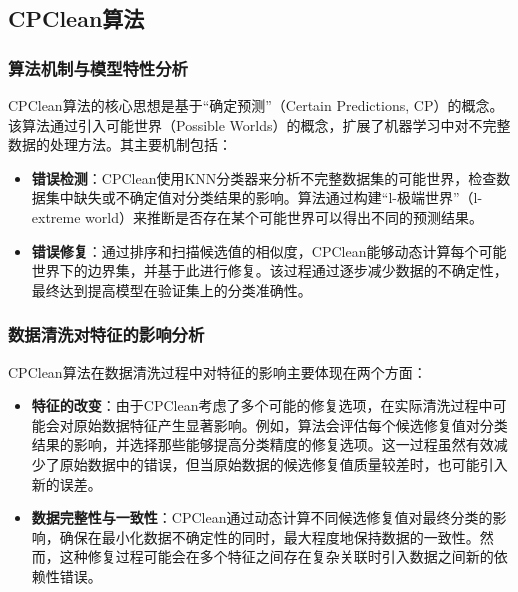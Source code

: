 \documentclass{ctexart} %
\begin{document}
\subsection{CPClean算法}

\subsubsection{算法机制与模型特性分析}

CPClean算法的核心思想是基于“确定预测”（Certain Predictions, CP）的概念。该算法通过引入可能世界（Possible Worlds）的概念，扩展了机器学习中对不完整数据的处理方法。其主要机制包括：

\begin{itemize}
    \item \textbf{错误检测}：CPClean使用KNN分类器来分析不完整数据集的可能世界，检查数据集中缺失或不确定值对分类结果的影响。算法通过构建“l-极端世界”（l-extreme world）来推断是否存在某个可能世界可以得出不同的预测结果。
    \item \textbf{错误修复}：通过排序和扫描候选值的相似度，CPClean能够动态计算每个可能世界下的边界集，并基于此进行修复。该过程通过逐步减少数据的不确定性，最终达到提高模型在验证集上的分类准确性。
\end{itemize}

\subsubsection{数据清洗对特征的影响分析}

CPClean算法在数据清洗过程中对特征的影响主要体现在两个方面：

\begin{itemize}
    \item \textbf{特征的改变}：由于CPClean考虑了多个可能的修复选项，在实际清洗过程中可能会对原始数据特征产生显著影响。例如，算法会评估每个候选修复值对分类结果的影响，并选择那些能够提高分类精度的修复选项。这一过程虽然有效减少了原始数据中的错误，但当原始数据的候选修复值质量较差时，也可能引入新的误差。
    \item \textbf{数据完整性与一致性}：CPClean通过动态计算不同候选修复值对最终分类的影响，确保在最小化数据不确定性的同时，最大程度地保持数据的一致性。然而，这种修复过程可能会在多个特征之间存在复杂关联时引入数据之间新的依赖性错误。
\end{itemize}
\end{document}
